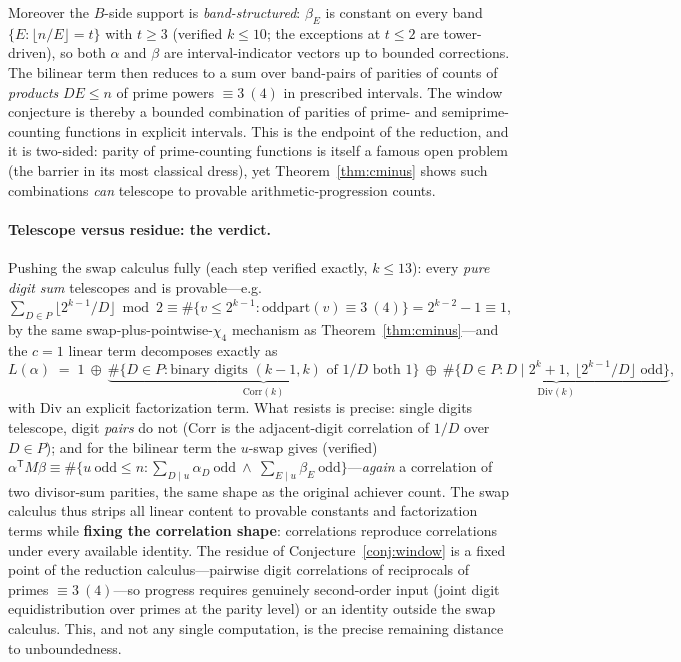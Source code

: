 \documentclass[11pt]{article}
\theoremstyle{remark}\newtheorem{remark}[theorem]{Remark}
\begin{document}
Moreover the $B$-side support is \emph{band-structured}: $\beta_E$ is constant on every band
$\{E:\lfloor n/E\rfloor=t\}$ with $t\ge3$ (verified $k\le10$; the exceptions at $t\le2$ are
tower-driven), so both $\alpha$ and $\beta$ are interval-indicator vectors up to bounded corrections.
The bilinear term then reduces to a sum over band-pairs of parities of counts of \emph{products}
$DE\le n$ of prime powers $\equiv3\ (4)$ in prescribed intervals. The window conjecture is thereby a
bounded combination of parities of prime- and semiprime-counting functions in explicit intervals.
This is the endpoint of the reduction, and it is two-sided: parity of prime-counting functions is
itself a famous open problem (the barrier in its most classical dress), yet
Theorem~\ref{thm:cminus} shows such combinations \emph{can} telescope to provable arithmetic-progression
counts.

\paragraph{Telescope versus residue: the verdict.} Pushing the swap calculus fully (each step
verified exactly, $k\le13$): every \emph{pure digit sum} telescopes and is provable---e.g.
$\sum_{D\in P}\lfloor 2^{k-1}/D\rfloor\bmod 2\equiv\#\{v\le2^{k-1}:\mathrm{oddpart}(v)\equiv3\
(4)\}=2^{k-2}-1\equiv1$, by the same swap-plus-pointwise-$\chi_4$ mechanism as
Theorem~\ref{thm:cminus}---and the $c{=}1$ linear term decomposes exactly as
\[
   L(\alpha)\;=\;1\ \oplus\ \underbrace{\#\{D\in P:\text{binary digits }(k{-}1,k)\text{ of }1/D
   \text{ both }1\}}_{\mathrm{Corr}(k)}\ \oplus\
   \underbrace{\#\{D\in P: D\mid 2^k{+}1,\ \lfloor2^{k-1}/D\rfloor\text{ odd}\}}_{\mathrm{Div}(k)} ,
\]
with $\mathrm{Div}$ an explicit factorization term. What resists is precise: single digits
telescope, digit \emph{pairs} do not ($\mathrm{Corr}$ is the adjacent-digit correlation of $1/D$
over $D\in P$); and for the bilinear term the $u$-swap gives (verified)
$\alpha^{\mathsf T}M\beta\equiv\#\{u\ \text{odd}\le n: \textstyle\sum_{D\mid u}\alpha_D\ \text{odd}\
\wedge\ \sum_{E\mid u}\beta_E\ \text{odd}\}$---\emph{again} a correlation of two divisor-sum
parities, the same shape as the original achiever count. The swap calculus thus strips all linear
content to provable constants and factorization terms while \textbf{fixing the correlation shape}:
correlations reproduce correlations under every available identity. The residue of
Conjecture~\ref{conj:window} is a fixed point of the reduction calculus---pairwise digit
correlations of reciprocals of primes $\equiv3\ (4)$---so progress requires genuinely second-order
input (joint digit equidistribution over primes at the parity level) or an identity outside the
swap calculus. This, and not any single computation, is the precise remaining distance to
unboundedness.
\end{document}
